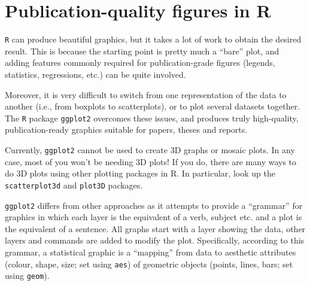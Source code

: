 
\section{Publication-quality figures in R}

{\tt R} can produce beautiful graphics, but it takes a lot of work to 
obtain the desired result. This is because the starting point is pretty 
much a ``bare'' plot, and adding features commonly required for 
publication-grade figures (legends, statistics, regressions, etc.) can 
be quite involved. 
	
Moreover, it is very difficult to switch from one representation of the 
data to another (i.e., from boxplots to scatterplots), or to plot 
several datasets together. The {\tt R} package {\tt ggplot2} overcomes 
these issues, and produces truly high-quality, publication-ready 
graphics suitable for papers, theses and reports. 

\begin{tipbox}
Currently, {\tt ggplot2} cannot be used to create 3D graphs or mosaic 
plots. In any case, most of you won't be needing 3D plots! If you do, 
there are many ways to do 3D plots using other plotting packages in R. 
In particular, look up the {\tt scatterplot3d} and {\tt plot3D} 
packages.
\end{tipbox}



	
	
	

{\tt ggplot2} differs from other approaches as it attempts to provide a 
``grammar'' for graphics in which each layer is the equivalent of a 
verb, subject etc. and a plot is the equivalent of a sentence. All 
graphs start with a layer showing the data, other layers and commands 
are added to modify the plot. Specifically, according to this grammar, 
a statistical graphic is a ``mapping'' from data to aesthetic 
attributes (colour, shape, size; set using {\tt aes}) of geometric 
objects (points, lines, bars; set using {\tt geom}).  

